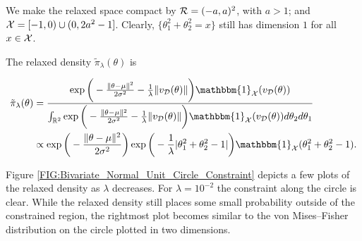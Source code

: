 \documentclass[10pt,fleqn]{article}
\DeclareMathOperator{\1}{\mathbbm{1}} \DeclareMathOperator{\bigO}{\mc O}
\begin{document}
We make the relaxed space compact by $\mathcal{R}=(-a,a)^2$, with $a> 1$; and $\mathcal{X}=[-1,0)\cup(0,2a^2-1]$. Clearly, $\{\theta_1^2+\theta_2^2=x\}$ still has
dimension $1$ for all $x\in \mathcal{X}$.

The relaxed density $\tilde{\pi}_\lambda(\theta)$ is

\begin{equation} \begin{split} \tilde{\pi}_\lambda(\theta)
&=\frac{\exp\bigg(-\frac{\|\theta-\mu\|^2}{2\sigma^2} -
\frac{1}{\lambda}\|v_{\mc
D}(\theta)\| \bigg) \mathbbm{1}_{\mc
X}(v_{\mc D}(\theta)) }{\int_{\mathbb{R}^2}
\exp\bigg(-\frac{\|\theta-\mu\|^2}{2\sigma^2}-\frac{1}{\lambda}\|v_{\mc
D}(\theta)\|
\bigg)  \mathbbm{1}_{\mc X}(v_{\mc D}(\theta))
d\theta_2d\theta_1}
\\ & \propto
\exp\bigg(-\frac{\|\theta-\mu\|^2}{2\sigma^2}\bigg)\exp\bigg(
- \frac{1}{\lambda}|\theta_1^2+\theta_2^2-1| \bigg)
\mathbbm{1}_{\mc X}(\theta_1^2+\theta_2^2-1).  \end{split}
\label{EQ:Relaxed_Density_Bivariate_Unit_Circle} \end{equation}

Figure \ref{FIG:Bivariate_Normal_Unit_Circle_Constraint} depicts a few plots
of the relaxed density as $\lambda$ decreases.  For $\lambda=10^{-2}$ the
constraint along the circle is clear. While the relaxed density still places
some small probability outside of the constrained region, the rightmost
plot becomes similar to the von Mises--Fisher distribution on the circle plotted in
two dimensions.




\end{document}
